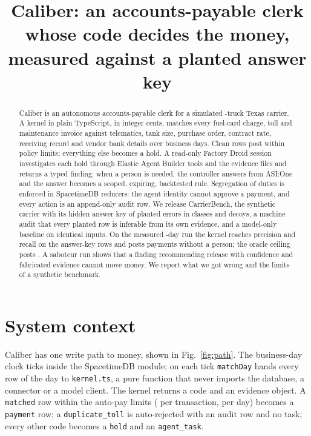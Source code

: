 \documentclass[conference]{IEEEtran}
\newcommand{\code}[1]{\texttt{#1}}
\begin{document}
\title{Caliber: an accounts-payable clerk whose code decides the money, measured against a planted answer key}

\author{\and{}}

\maketitle

\begin{abstract}
Caliber is an autonomous accounts-payable clerk for a simulated \nTrucks-truck Texas carrier. A kernel in plain TypeScript, in integer cents, matches every fuel-card charge, toll and maintenance invoice against telematics, tank size, purchase order, contract rate, receiving record and vendor bank details over \nDays{} business days. Clean rows post within policy limits; everything else becomes a hold. A read-only Factory Droid session investigates each hold through Elastic Agent Builder tools and the evidence files and returns a typed finding; when a person is needed, the controller answers from ASI:One and the answer becomes a scoped, expiring, backtested rule. Segregation of duties is enforced in SpacetimeDB reducers: the agent identity cannot approve a payment, and every action is an append-only audit row. We release CarrierBench, the synthetic carrier with its hidden answer key of \nPlanted{} planted errors in \nClasses{} classes and \nDecoys{} decoys, a machine audit that every planted row is inferable from its own evidence, and a model-only baseline on identical inputs. On the measured \nDays-day run the kernel reaches precision \overallP{} and recall \overallR{} on the \nKeyRows{} answer-key rows and posts \autoPaidCount{} payments without a person; the oracle ceiling posts \oraclePosted. A saboteur run shows that a finding recommending release with confidence \sabConfidence{} and fabricated evidence cannot move money. We report what we got wrong and the limits of a synthetic benchmark.
\end{abstract}

\section{System context}

Caliber has one write path to money, shown in Fig.~\ref{fig:path}. The business-day clock ticks inside the SpacetimeDB module; on each tick \code{matchDay} hands every row of the day to \code{kernel.ts}, a pure function that never imports the database, a connector or a model client. The kernel returns a code and an evidence object. A \code{matched} row within the auto-pay limits (\autoPayUsd{} per transaction, \autoPayDayUsd{} per day) becomes a \code{payment} row; a \code{duplicate\_toll} is auto-rejected with an audit row and no task; every other code becomes a \code{hold} and an \code{agent\_task}.
\end{document}
